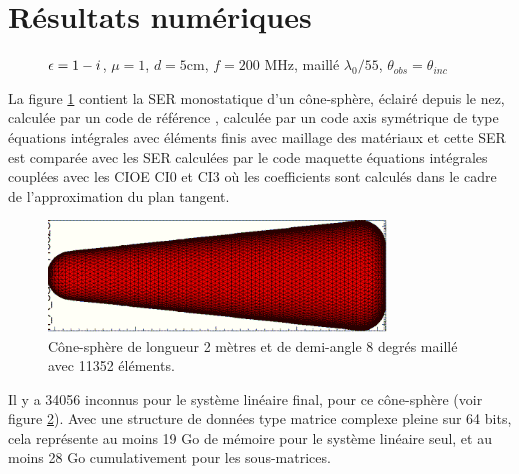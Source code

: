 \section{Résultats numériques}

  \begin{figure}[!hbt]
    \centering
    
    \caption{\(\epsilon = 1 - i\), \(\mu = 1\), \(d = 5\)cm, \( f =  200\) MHz, maillé \(\lambda_0/55\), \(\theta_{obs}=\theta_{inc}\)}
    \label{fig:ser:cone-sphere-mono-M1}
  \end{figure}

  La figure \ref{fig:ser:cone-sphere-mono-M1} contient la SER monostatique d'un cône-sphère, éclairé depuis le nez, calculée par un code de référence , calculée par un code axis symétrique de type équations intégrales avec éléments finis avec maillage des matériaux et cette SER est comparée avec les SER calculées par le code maquette équations intégrales couplées avec les CIOE CI0 et CI3 où les coefficients sont calculés dans le cadre de l'approximation du plan tangent.

  \begin{figure}[!hbt]
    \centering
    \includegraphics[width=0.8\textwidth]{images/cone.png}
    \caption{Cône-sphère de longueur 2 mètres et de demi-angle 8 degrés maillé avec 11352 éléments.}
    \label{fig:obj:cone-sphere}
  \end{figure}

  Il y a 34056 inconnus pour le système linéaire final, pour ce cône-sphère (voir figure \ref{fig:obj:cone-sphere}).
  Avec une structure de données type matrice complexe pleine sur 64 bits, cela représente au moins 19 Go de mémoire pour le système linéaire seul, et au moins 28 Go cumulativement pour les sous-matrices.


